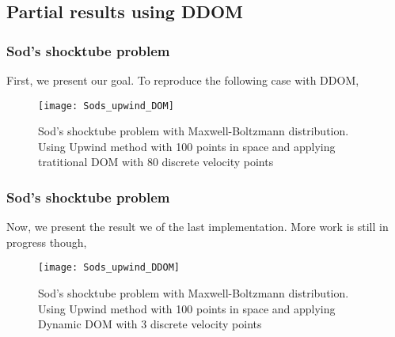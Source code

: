 \subsection{Partial results using DDOM}

\begin{frame}
	\frametitle{Sod's shocktube problem}
	First, we present our goal. To reproduce the following case with DDOM,
	\begin{figure}
		\centering
			\texttt{[image: Sods\_upwind\_DOM]}
		\caption{Sod's shocktube problem with Maxwell-Boltzmann distribution. Using Upwind method with 100 points in space and applying tratitional DOM with 80 discrete velocity points}
		\label{fig:Sods_upwind_DOM}
	\end{figure}
\end{frame}

\begin{frame}
	\frametitle{Sod's shocktube problem}
	Now, we present the result we of the last implementation. More work is still in progress though,
	\begin{figure}
		\centering
			\texttt{[image: Sods\_upwind\_DDOM]}
		\caption{Sod's shocktube problem with Maxwell-Boltzmann distribution. Using Upwind method with 100 points in space and applying Dynamic DOM with 3 discrete velocity points}
		\label{fig:Sods_upwind_DDOM}
	\end{figure}
\end{frame}